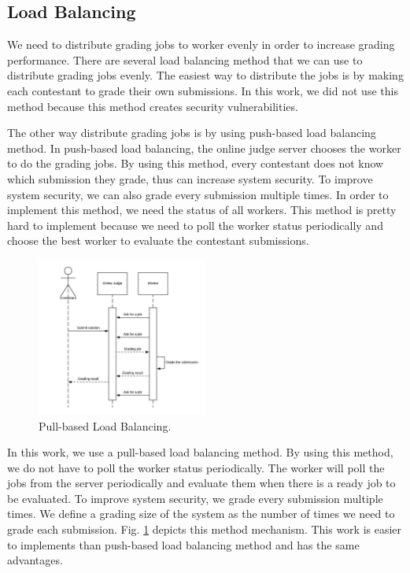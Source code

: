 \documentclass[conference,a4paper]{IEEEtran}
\begin{document}
\subsection{Load Balancing}

We need to distribute grading jobs to worker evenly in order to increase grading performance. There are several load balancing method that we can use to distribute grading jobs evenly. The easiest way to distribute the jobs is by making each contestant to grade their own submissions. In this work, we did not use this method because this method creates security vulnerabilities.

The other way distribute grading jobs is by using push-based load balancing method. In push-based load balancing, the online judge server chooses the worker to do the grading jobs. By using this method, every contestant does not know which submission they grade, thus can increase system security. To improve system security, we can also grade every submission multiple times. In order to implement this method, we need the status of all workers. This method is pretty hard to implement because we need to poll the worker status periodically and choose the best worker to evaluate the contestant submissions.

\begin{figure}[htbp]
\centerline{\includegraphics[width=0.5\textwidth]{images/paper-pull-based-load-balancing.jpeg}}
\caption{Pull-based Load Balancing.}
\label{pull-based-load-balancing}
\end{figure}

In this work, we use a pull-based load balancing method. By using this method, we do not have to poll the worker status periodically. The worker will poll the jobs from the server periodically and evaluate them when there is a ready job to be evaluated. To improve system security, we grade every submission multiple times. We define a grading size of the system as the number of times we need to grade each submission. Fig. \ref{pull-based-load-balancing} depicts this method mechanism. This work is easier to implements than push-based load balancing method and has the same advantages.
\end{document}
